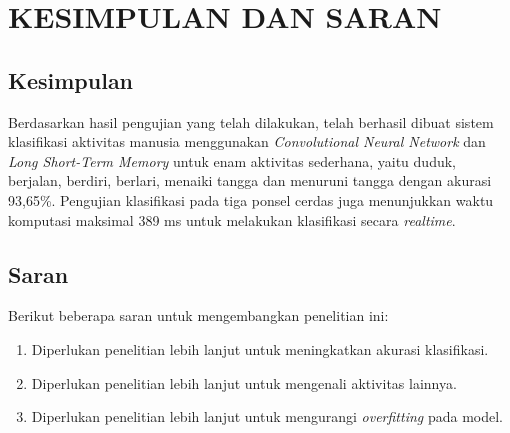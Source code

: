 \chapter{KESIMPULAN DAN SARAN}

\section{Kesimpulan}
Berdasarkan hasil pengujian yang telah dilakukan, telah berhasil dibuat sistem klasifikasi aktivitas manusia menggunakan \textit{Convolutional Neural Network} dan \textit{Long Short-Term Memory} untuk enam aktivitas sederhana, yaitu duduk, berjalan, berdiri, berlari, menaiki tangga dan menuruni tangga dengan akurasi 93,65\%. Pengujian klasifikasi pada tiga ponsel cerdas juga menunjukkan waktu komputasi maksimal 389 ms untuk melakukan klasifikasi secara \textit{realtime}.

\section{Saran}
Berikut beberapa saran untuk mengembangkan penelitian ini:

\begin{enumerate}
    \item Diperlukan penelitian lebih lanjut untuk meningkatkan akurasi klasifikasi.
    \item Diperlukan penelitian lebih lanjut untuk mengenali aktivitas lainnya.
    \item Diperlukan penelitian lebih lanjut untuk mengurangi \textit{overfitting} pada model.
\end{enumerate}
